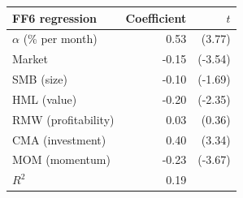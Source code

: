 \begin{tabular}{lrr}
\toprule
FF6 regression & Coefficient & $t$ \\
\midrule
$\alpha$ (\% per month) & 0.53 & (3.77) \\
Market & -0.15 & (-3.54) \\
SMB (size) & -0.10 & (-1.69) \\
HML (value) & -0.20 & (-2.35) \\
RMW (profitability) & 0.03 & (0.36) \\
CMA (investment) & 0.40 & (3.34) \\
MOM (momentum) & -0.23 & (-3.67) \\
$R^2$ & 0.19 &  \\
\bottomrule
\end{tabular}
